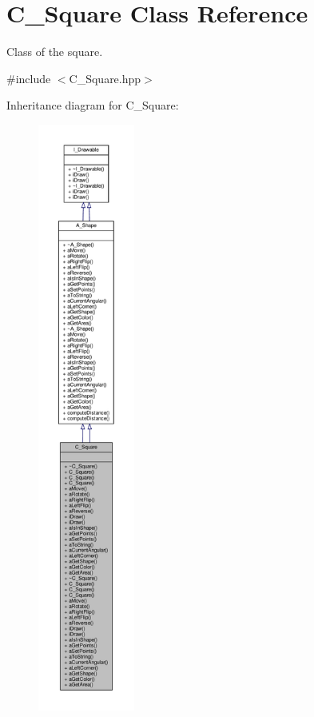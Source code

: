 \hypertarget{classC__Square}{}\section{C\+\_\+\+Square Class Reference}
\label{classC__Square}


Class of the square.  




{\ttfamily \#include $<$C\+\_\+\+Square.\+hpp$>$}



Inheritance diagram for C\+\_\+\+Square\+:\nopagebreak
\begin{figure}[H]
\begin{center}
\leavevmode
\includegraphics[height=550pt]{classC__Square__inherit__graph}
\end{center}
\end{figure}


